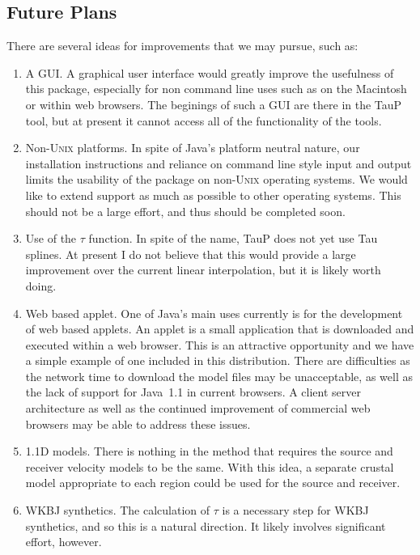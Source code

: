  
\subsection{Future Plans}

There are several ideas for improvements that we may pursue, such as:

\begin{enumerate}
\item A GUI. A graphical user interface would greatly improve the usefulness
of this package, especially for non command line uses such as on the Macintosh
or within web browsers. The beginings of such a GUI are there in the TauP tool,
but at present it cannot access all of the functionality of the tools.

\item Non-\textsc{Unix} platforms. In spite of Java's platform neutral nature,
our installation instructions and reliance on command line style input and output limits the usability of the package on non-\textsc{Unix} operating systems. 
We would like to extend support as much as possible to other operating
systems. This should not be a large effort, and thus should be completed soon.

\item Use of the $\tau$ function. In spite of the name, TauP does not yet use
Tau splines. At present I do not believe that this would provide a large
improvement over the current linear interpolation, but it is likely worth doing.

\item Web based applet. One of Java's main uses currently is for the development of web based applets. An applet is a small application that is downloaded and
executed within a web browser. This is an attractive opportunity and we have a simple
example of one included in this distribution. 
There are difficulties as the network time to download the 
model files may be unacceptable, as well as the lack of support for Java~1.1 in current browsers. A client server architecture as well as the continued improvement of commercial web browsers
may be able to address these issues.

\item 1.1D models. There is nothing in the method that requires the source and
receiver velocity models to be the same. With this idea, a separate crustal 
model appropriate to each region could be used for the source and receiver.

\item WKBJ synthetics. The calculation of $\tau$ is a necessary step for WKBJ 
synthetics, and so this is a natural direction. It likely involves significant 
effort, however.
\end{enumerate}
